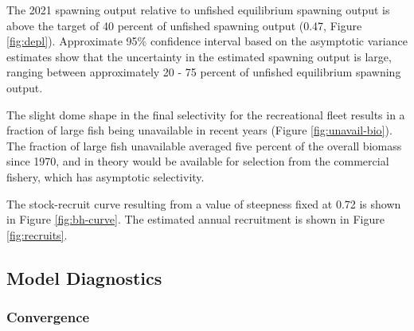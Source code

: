 \documentclass[11pt,
  english,
  a4paper,
]{article}
\begin{document}
\leavevmode\tagmcend\tagstructend\par


The 2021 spawning output relative to unfished equilibrium spawning output is above the target of 40 percent of unfished spawning output (0.47, Figure \ref{fig:depl}). Approximate 95\% confidence interval based on the asymptotic variance estimates show that the uncertainty in the estimated spawning output is large, ranging between approximately 20 - 75 percent of unfished equilibrium spawning output.

\leavevmode\tagmcend\tagstructend\par


The slight dome shape in the final selectivity for the recreational fleet results in a fraction of large fish being unavailable in recent years (Figure \ref{fig:unavail-bio}). The fraction of large fish unavailable averaged five percent of the overall biomass since 1970, and in theory would be available for selection from the commercial fishery, which has asymptotic selectivity.

\leavevmode\tagmcend\tagstructend\par


The stock-recruit curve resulting from a value of steepness fixed at 0.72 is shown in Figure \ref{fig:bh-curve}. The estimated annual recruitment is shown in Figure \ref{fig:recruits}.

\leavevmode\tagmcend\tagstructend\par


\hypertarget{model-diagnostics}{%
\subsection{Model Diagnostics}\label{model-diagnostics}}

\leavevmode\tagmcend\tagstructend


\hypertarget{convergence}{%
\subsubsection{Convergence}\label{convergence}}
\end{document}

